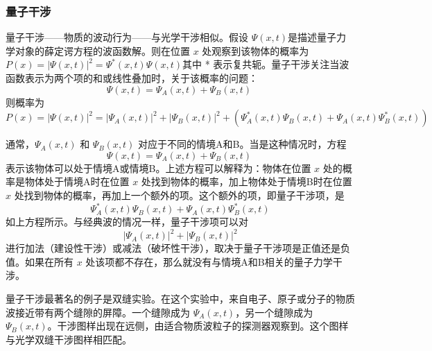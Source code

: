 \subsubsection{量子干涉}
量子干涉——物质的波动行为——与光学干涉相似。假设  \(\Psi(x,t)\)是描述量子力学对象的薛定谔方程的波函数解。则在位置 \(x\) 处观察到该物体的概率为 \(P(x) = |\Psi(x,t)|^2 = \Psi^*(x,t) \Psi(x,t)\)其中 * 表示复共轭。量子干涉关注当波函数表示为两个项的和或线性叠加时，关于该概率的问题：  
\[
\Psi(x,t) = \Psi_A(x,t) + \Psi_B(x,t)~
\]
则概率为  
\[
P(x) = |\Psi(x,t)|^2 = |\Psi_A(x,t)|^2 + |\Psi_B(x,t)|^2 + (\Psi_A^*(x,t) \Psi_B(x,t) + \Psi_A(x,t) \Psi_B^*(x,t))~
\]

通常，\(\Psi_A(x,t)\) 和 \(\Psi_B(x,t)\) 对应于不同的情境A和B。当是这种情况时，方程  
\[
\Psi(x,t) = \Psi_A(x,t) + \Psi_B(x,t)~
\]
表示该物体可以处于情境A或情境B。上述方程可以解释为：物体在位置 \(x\) 处的概率是物体处于情境A时在位置 \(x\) 处找到物体的概率，加上物体处于情境B时在位置 \(x\) 处找到物体的概率，再加上一个额外的项。这个额外的项，即量子干涉项，是  
\[
\Psi_A^*(x,t) \Psi_B(x,t) + \Psi_A(x,t) \Psi_B^*(x,t)
\]
如上方程所示。与经典波的情况一样，量子干涉项可以对  
\[
|\Psi_A(x,t)|^2 + |\Psi_B(x,t)|^2
\]
进行加法（建设性干涉）或减法（破坏性干涉），取决于量子干涉项是正值还是负值。如果在所有 \(x\) 处该项都不存在，那么就没有与情境A和B相关的量子力学干涉。

量子干涉最著名的例子是双缝实验。在这个实验中，来自电子、原子或分子的物质波接近带有两个缝隙的屏障。一个缝隙成为 \(\Psi_A(x,t)\)，另一个缝隙成为 \(\Psi_B(x,t)\)。干涉图样出现在远侧，由适合物质波粒子的探测器观察到。这个图样与光学双缝干涉图样相匹配。